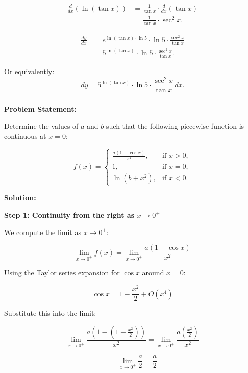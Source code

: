 \documentclass{article}
\begin{document}
\begin{align*}
	\frac{d}{dx} \left( \ln{(\tan{x})} \right) &= \frac{1}{\tan{x}} \cdot \frac{d}{dx} \left( \tan{x} \right) \\
	&= \frac{1}{\tan{x}} \cdot \sec^2{x}.
\end{align*}

\begin{align*}
	\frac{dy}{dx} &= e^{\ln{(\tan{x})} \cdot \ln{5}} \cdot \ln{5} \cdot \frac{\sec^2{x}}{\tan{x}} \\
	&= 5^{\ln{(\tan{x})}} \cdot \ln{5} \cdot \frac{\sec^2{x}}{\tan{x}}.
\end{align*}

Or equivalently:
\[
dy = 5^{\ln{(\tan{x})}} \cdot \ln{5} \cdot \frac{\sec^2{x}}{\tan{x}} \, dx.
\]

		\subsubsection{}
	
	
	
	\textbf{Problem Statement:}
	
	Determine the values of \( a \) and \( b \) such that the following piecewise function is continuous at \( x = 0 \):
	
	\[
	f(x) =
	\begin{cases}
		\frac{a(1 - \cos x)}{x^2}, & \text{if } x > 0, \\
		1, & \text{if } x = 0, \\
		\ln(b + x^2), & \text{if } x < 0.
	\end{cases}
	\]
	
	\textbf{Solution:}
	
	\textbf{Step 1: Continuity from the right as \( x \to 0^+ \)}
	
	We compute the limit as \( x \to 0^+ \):
	
	\[
	\lim_{x \to 0^+} f(x) = \lim_{x \to 0^+} \frac{a(1 - \cos x)}{x^2}
	\]
	
	Using the Taylor series expansion for \( \cos x \) around \( x = 0 \):
	
	\[
	\cos x = 1 - \frac{x^2}{2} + O(x^4)
	\]
	
	Substitute this into the limit:
	
	\[
	\lim_{x \to 0^+} \frac{a \left(1 - \left(1 - \frac{x^2}{2}\right)\right)}{x^2} 
	= \lim_{x \to 0^+} \frac{a\left(\frac{x^2}{2}\right)}{x^2}
	\]
	
	\[
	= \lim_{x \to 0^+} \frac{a}{2} = \frac{a}{2}
	\]
	
\end{document}
